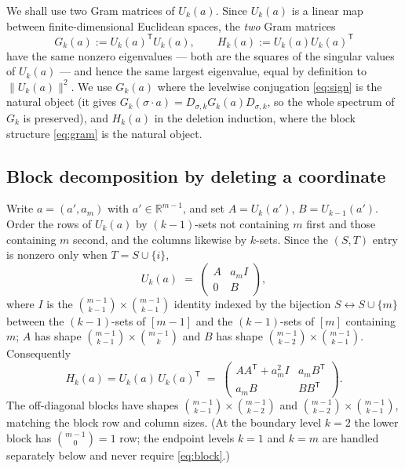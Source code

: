 \documentclass[11pt]{article}
\theoremstyle{remark}
\begin{document}
We shall use two Gram matrices of $U_k(a)$. Since $U_k(a)$ is a linear map
between finite-dimensional Euclidean spaces, the \emph{two} Gram
matrices
\[
G_k(a):=U_k(a)^{\mathsf T}U_k(a),
\qquad
H_k(a):=U_k(a)U_k(a)^{\mathsf T}
\]
have the same nonzero eigenvalues --- both are the squares of the
singular values of $U_k(a)$ --- and hence the same largest eigenvalue,
equal by definition to $\|U_k(a)\|^2$. We use $G_k(a)$ where the
levelwise conjugation \eqref{eq:sign} is the natural object (it gives
$G_k(\sigma\!\cdot\!a)=D_{\sigma,k}G_k(a)D_{\sigma,k}$, so the whole
spectrum of $G_k$ is preserved), and $H_k(a)$ in the deletion induction,
where the block structure \eqref{eq:gram} is the natural object.

\subsection{Block decomposition by deleting a coordinate}
Write $a=(a',a_m)$ with $a'\in\mathbb{R}^{m-1}$, and set
$A=U_k(a')$, $B=U_{k-1}(a')$. Order the rows of $U_k(a)$ by $(k-1)$-sets
not containing $m$ first and those containing $m$ second, and the columns
likewise by $k$-sets. Since the $(S,T)$ entry is nonzero only when
$T=S\cup\{i\}$,
\begin{equation}\label{eq:block}
U_k(a)\;=\;
\begin{pmatrix} A & a_m I\\ 0 & B \end{pmatrix},
\end{equation}
where $I$ is the $\binom{m-1}{k-1}\times\binom{m-1}{k-1}$ identity
indexed by the bijection $S\leftrightarrow S\cup\{m\}$ between the
$(k-1)$-sets of $[m-1]$ and the $(k-1)$-sets of $[m]$ containing $m$;
$A$ has shape $\binom{m-1}{k-1}\times\binom{m-1}{k}$ and $B$ has shape
$\binom{m-1}{k-2}\times\binom{m-1}{k-1}$. Consequently
\begin{equation}\label{eq:gram}
H_k(a)=U_k(a)\,U_k(a)^{\mathsf T}\;=\;
\begin{pmatrix} AA^{\mathsf T}+a_m^2 I & a_m B^{\mathsf T}\\
a_m B & BB^{\mathsf T} \end{pmatrix}.
\end{equation}
The off-diagonal blocks have shapes
$\binom{m-1}{k-1}\times\binom{m-1}{k-2}$ and
$\binom{m-1}{k-2}\times\binom{m-1}{k-1}$, matching the block row and
column sizes. (At the boundary level $k=2$ the lower block has
$\binom{m-1}{0}=1$ row; the endpoint levels $k=1$ and $k=m$ are handled
separately below and never require \eqref{eq:block}.)
\end{document}
